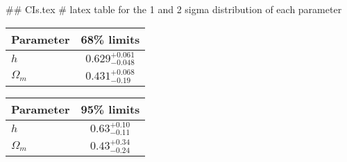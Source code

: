 ## CIs.tex
# latex table for the 1 and 2 sigma distribution of each parameter

\begin{tabular} { l  c}
 Parameter &  68\% limits\\
\hline
{\boldmath$h              $} & $0.629^{+0.061}_{-0.048}   $\\
{\boldmath$\Omega_m       $} & $0.431^{+0.068}_{-0.19}    $\\
\hline
\end{tabular}

\begin{tabular} { l  c}
 Parameter &  95\% limits\\
\hline
{\boldmath$h              $} & $0.63^{+0.10}_{-0.11}      $\\
{\boldmath$\Omega_m       $} & $0.43^{+0.34}_{-0.24}      $\\
\hline
\end{tabular}
